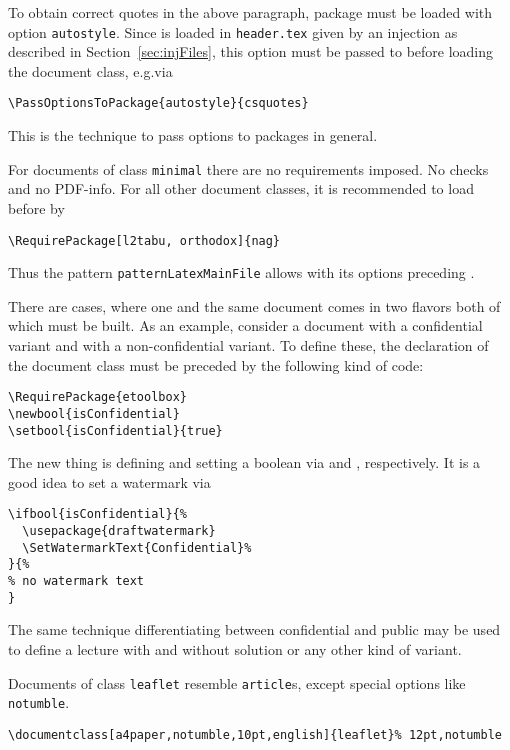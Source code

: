 To obtain correct quotes in the above paragraph, 
package  must be loaded with option \texttt{autostyle}. 
Since  is loaded in \texttt{header.tex} 
given by an injection as described in Section~\ref{sec:injFiles}, 
this option must be passed to  
before loading the document class, e.g.\@ via 
%
\begin{Verbatim}[fontsize=\small]
  \PassOptionsToPackage{autostyle}{csquotes}
\end{Verbatim}
%
This is the technique to pass options to packages in general. 

For documents of class \texttt{minimal} there are no requirements imposed. 
No checks and no PDF-info. 
For all other document classes, it is recommended to load  
before  by 
%
\begin{Verbatim}[fontsize=\small]
  \RequirePackage[l2tabu, orthodox]{nag}
\end{Verbatim}
%
Thus the pattern \texttt{patternLatexMainFile} 
allows  with its options preceding . 

There are cases, where one and the same document 
comes in two flavors both of which must be built. 
As an example, consider a document with a confidential variant 
and with a non-confidential variant. 
To define these, the declaration of the document class 
must be preceded by the following kind of code: 
%
\begin{Verbatim}[fontsize=\small]
\RequirePackage{etoolbox}
\newbool{isConfidential}
\setbool{isConfidential}{true}
\end{Verbatim}

The new thing is defining and setting a boolean 
via  and , respectively. 
It is a good idea to set a watermark via 
%
\begin{Verbatim}[fontsize=\small]
\ifbool{isConfidential}{%
  \usepackage{draftwatermark}
  \SetWatermarkText{Confidential}%
}{%
% no watermark text
}
\end{Verbatim}

The same technique differentiating between confidential and public 
may be used to define a lecture with and without solution 
or any other kind of variant. 

Documents of class \texttt{leaflet} resemble \texttt{article}s, 
except special options like \texttt{notumble}. 

\begin{Verbatim}[fontsize=\footnotesize]
  \documentclass[a4paper,notumble,10pt,english]{leaflet}% 12pt,notumble
\end{Verbatim}

